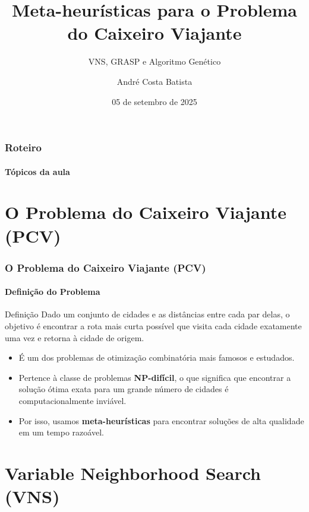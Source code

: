 \documentclass{beamer}
\title[Meta-Heurísticas]{Meta-heurísticas para o Problema do Caixeiro Viajante}
\subtitle{VNS, GRASP e Algoritmo Genético}
\author[André Batista]{André Costa Batista}
\institute[ELE634]{ELE634 Laboratório de Sistemas II\\Escola de Engenharia\\Universidade Federal de Minas Gerais}
\date{05 de setembro de 2025}
\begin{document}
\begin{frame}
  \titlepage
\end{frame}

\begin{frame}
  \frametitle{Roteiro}
  \framesubtitle{Tópicos da aula}
  \tableofcontents
\end{frame}

\section{O Problema do Caixeiro Viajante (PCV)}

\begin{frame}
  \frametitle{O Problema do Caixeiro Viajante (PCV)}
  \framesubtitle{Definição do Problema}
  \begin{block}{Definição}
    Dado um conjunto de cidades e as distâncias entre cada par delas, o objetivo é encontrar a rota mais curta possível que visita cada cidade exatamente uma vez e retorna à cidade de origem.
  \end{block}
  
  \begin{itemize}
    \item É um dos problemas de otimização combinatória mais famosos e estudados.
    \item Pertence à classe de problemas \textbf{NP-difícil}, o que significa que encontrar a solução ótima exata para um grande número de cidades é computacionalmente inviável.
    \item Por isso, usamos \textbf{meta-heurísticas} para encontrar soluções de alta qualidade em um tempo razoável.
  \end{itemize}
  
\end{frame}

\section{Variable Neighborhood Search (VNS)}
\end{document}
